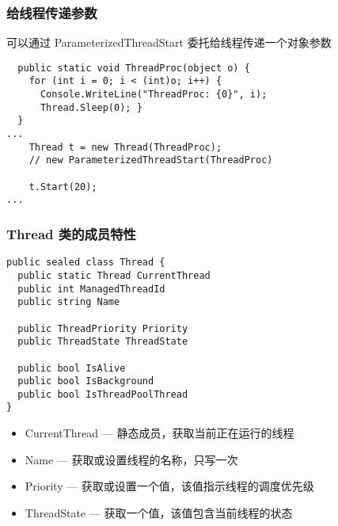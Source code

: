 \begin{frame}[fragile]
\frametitle{给线程传递参数}
可以通过 ParameterizedThreadStart 委托给线程传递一个对象参数
\begin{lstlisting}
  public static void ThreadProc(object o) {
    for (int i = 0; i < (int)o; i++) {
      Console.WriteLine("ThreadProc: {0}", i);
      Thread.Sleep(0); }
  }
...
    Thread t = new Thread(ThreadProc);
    // new ParameterizedThreadStart(ThreadProc)

    t.Start(20);
...
\end{lstlisting}
\end{frame}

\begin{frame}[fragile]
\frametitle{Thread 类的成员特性}
\begin{lstlisting}
public sealed class Thread {
  public static Thread CurrentThread
  public int ManagedThreadId
  public string Name

  public ThreadPriority Priority
  public ThreadState ThreadState

  public bool IsAlive
  public bool IsBackground
  public bool IsThreadPoolThread
}
\end{lstlisting}
\begin{itemize}
\item CurrentThread --- 静态成员，获取当前正在运行的线程
\item Name --- 获取或设置线程的名称，只写一次
\item Priority --- 获取或设置一个值，该值指示线程的调度优先级
\item ThreadState --- 获取一个值，该值包含当前线程的状态
\end{itemize}
\end{frame}


